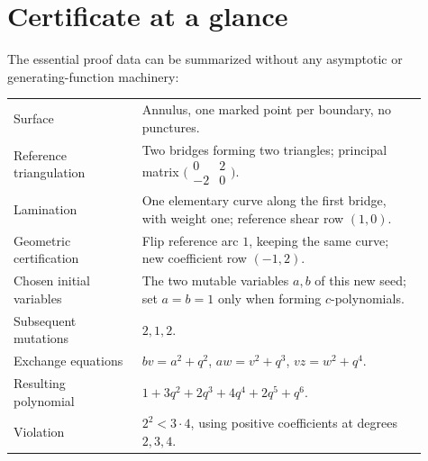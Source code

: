 \documentclass[11pt,letterpaper]{article}
\numberwithin{equation}{section}
\theoremstyle{definition}
\begin{document}
\section{Certificate at a glance}\label{app:certificate}

The essential proof data can be summarized without any asymptotic or
generating-function machinery:
\begin{center}
\begin{tabular}{p{0.29\linewidth}p{0.62\linewidth}}
\toprule
Surface & Annulus, one marked point per boundary, no punctures.\\
Reference triangulation & Two bridges forming two triangles; principal
matrix $\bigl(\begin{smallmatrix}0&2\\-2&0\end{smallmatrix}\bigr)$.\\
Lamination & One elementary curve along the first bridge, with weight one;
reference shear row $(1,0)$.\\
Geometric certification & Flip reference arc $1$, keeping the same curve;
new coefficient row $(-1,2)$.\\
Chosen initial variables & The two mutable variables $a,b$ of this new seed;
set $a=b=1$ only when forming $c$-polynomials.\\
Subsequent mutations & $2,1,2$.\\
Exchange equations & $bv=a^2+q^2$, $aw=v^2+q^3$, $vz=w^2+q^4$.\\
Resulting polynomial & $1+3q^2+2q^3+4q^4+2q^5+q^6$.\\
Violation & $2^2<3\cdot4$, using positive coefficients at degrees $2,3,4$.\\
\bottomrule
\end{tabular}
\end{center}
\end{document}
